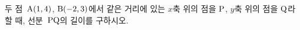두 점~$\mathrm{A}(1{,}\mkern3mu\mathopen{}4)$, $\mathrm{B}(-2{,}\mkern3mu\mathopen{}3)$에서 같은 거리에 있는 $x$축 위의 점을 $\mathrm{P}$, $y$축 위의 점을 $\mathrm{Q}$라 할 때, 선분~$\mathrm{PQ}$의 길이를 구하시오.
